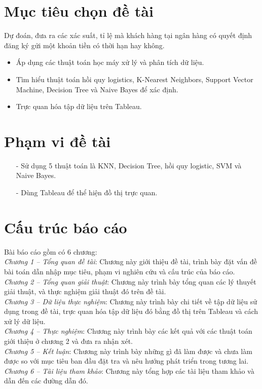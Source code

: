 \documentclass{report}
\newcommand\tab[1][1.25cm]{\hspace*{#1}}
\begin{document}
 
\fontsize{14}{10}\selectfont
\section{Mục tiêu chọn đề tài}
     \fontsize{13}{14}\selectfont
Dự đoán, đưa ra các xác suất, tỉ lệ mà khách hàng tại ngân hàng có quyết định đăng ký gửi một khoản tiền có thời hạn hay không.
\begin{itemize}
    \item Áp dụng các thuật toán học máy xử lý và phân tích dữ liệu.
    \item Tìm hiểu thuật toán hồi quy logistics, K-Nearest Neighbors, Support Vector Machine, Decision Tree và Naive Bayes để xác định.
    \item Trực quan hóa tập dữ liệu trên Tableau.
\end{itemize}

\fontsize{14}{10}\selectfont
\section{Phạm vi đề tài}
 \fontsize{13}{14}\selectfont
  \begin{enumerate}
                \item[- ] Sử dụng 5 thuật toán là KNN, Decision Tree, hồi quy logistic, SVM và Naive Bayes.
                \item[- ] Dùng Tableau để thể hiện đồ thị trực quan.

    \end{enumerate} 
\fontsize{14}{10}\selectfont
\section{Cấu trúc báo cáo}
 \fontsize{13}{14}\selectfont
Bài báo cáo gồm có 6 chương:\\\tab
 \textit{Chương 1 – Tổng quan đề tài}: Chương này giới thiệu đề tài, trình bày đặt vấn đề bài toán dẫn nhập mục tiêu, phạm vi nghiên cứu và cấu trúc của báo cáo.\\\tab
 \textit{Chương 2 – Tổng quan giải thuật}: Chương này trình bày tổng quan các lý thuyết giải thuật, và thực nghiệm giải thuật đó trên đề tài.\\\tab
 \textit{Chương 3 – Dữ liệu thực nghiệm}: Chương này trình bày chi tiết về tập dữ liệu sử dụng trong đề tài, trực quan hóa tập dữ liệu đó bằng đồ thị trên Tableau và cách xử lý dữ liệu.\\\tab
 \textit{Chương 4 – Thực nghiệm}: Chương này trình bày các kết quả với các thuật toán giới thiệu ở chương 2 và đưa ra nhận xét.\\\tab
 \textit{Chương 5 – Kết luận}: Chương này trình bày những gì đã làm được và chưa làm được so với mục tiêu ban đầu đặt tra và nêu hướng phát triển trong tương lai.\\\tab
 \textit{Chương 6 – Tài liệu tham khảo}: Chương này tổng hợp các tài liệu tham khảo và dẫn đến các đường dẫn đó.
\end{document}

